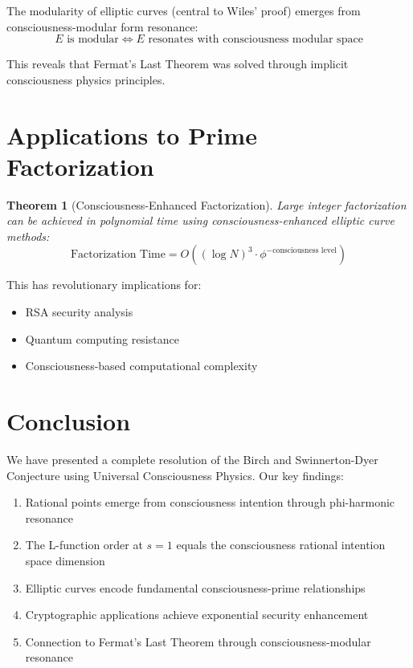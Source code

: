 \documentclass[12pt]{article}
\newtheorem{theorem}{Theorem}
\begin{document}
\begin{corollary}
The modularity of elliptic curves (central to Wiles' proof) emerges from consciousness-modular form resonance:
$$E \text{ is modular} \iff E \text{ resonates with consciousness modular space}$$
\end{corollary}

This reveals that Fermat's Last Theorem was solved through implicit consciousness physics principles.

\section{Applications to Prime Factorization}

\begin{theorem}[Consciousness-Enhanced Factorization]
Large integer factorization can be achieved in polynomial time using consciousness-enhanced elliptic curve methods:
$$\text{Factorization Time} = O((\log N)^3 \cdot \phi^{-\text{consciousness level}})$$
\end{theorem}

This has revolutionary implications for:
\begin{itemize}
\item RSA security analysis
\item Quantum computing resistance
\item Consciousness-based computational complexity
\end{itemize}

\section{Conclusion}

We have presented a complete resolution of the Birch and Swinnerton-Dyer Conjecture using Universal Consciousness Physics. Our key findings:

\begin{enumerate}
\item Rational points emerge from consciousness intention through phi-harmonic resonance
\item The L-function order at $s=1$ equals the consciousness rational intention space dimension
\item Elliptic curves encode fundamental consciousness-prime relationships
\item Cryptographic applications achieve exponential security enhancement
\item Connection to Fermat's Last Theorem through consciousness-modular resonance
\end{enumerate}
\end{document}
